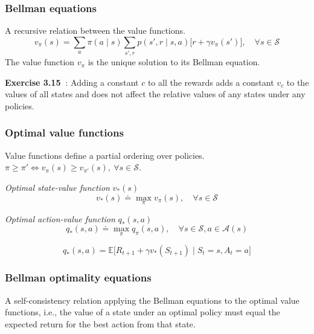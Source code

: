 \subsubsection{Bellman equations}

A recursive relation between the value functions.
\begin{equation}
    v_\pi(s) = \sum_{a} \pi(a \mid s) \sum_{s', r} p(s', r \mid s, a) \Big[ r + \gamma v_\pi(s') \Big]
    , \quad \forall s \in \mathcal{S}
\end{equation}
The value function \( v_\pi \) is the unique solution to its Bellman equation.

\textbf{Exercise 3.15~\cite{Sutton1998}}:
Adding a constant \( c \) to all the rewards adds a constant \( v_c \) to the values of all states and does not affect the relative values of any states under any policies.

\subsubsection{Optimal value functions}

Value functions define a partial ordering over policies.
\( \pi \geq \pi' \iff v_\pi(s) \geq v_{\pi'}(s), \ \forall s \in \mathcal{S} \).

\textit{Optimal state-value function} \( v_*(s) \)
\begin{equation}
    v_*(s) \doteq \max_{\pi} v_\pi(s)
    , \quad \forall s \in \mathcal{S}
\end{equation}

\textit{Optimal action-value function} \( q_*(s, a) \)
\begin{equation}
    q_*(s, a) \doteq \max_{\pi} q_\pi(s, a)
    , \quad \forall s \in \mathcal{S}, a \in \mathcal{A}(s)
\end{equation}

\begin{equation}
    q_*(s, a) = \mathbb{E} \big[ R_{t+1} + \gamma v_*(S_{t+1}) \;\big|\; S_t = s, A_t = a \big]
\end{equation}

\subsubsection{Bellman optimality equations}\label{sec:bellman-optimality-equations}

A self-consistency relation applying the Bellman equations to the optimal value functions, i.e., the value of a state under an optimal policy must equal the expected return for the best action from that state.

